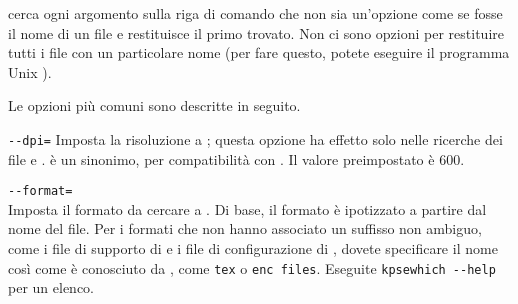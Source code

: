 \documentclass{article}
\begin{document}
\KPS{} cerca ogni argomento sulla riga di comando che non sia un'opzione
come se fosse il nome di un file e restituisce il primo trovato. Non ci
sono opzioni per restituire tutti i file con un particolare nome (per fare
questo, potete eseguire il programma Unix ).

Le opzioni più comuni sono descritte in seguito.

\begin{ttdescription}
\item[\texttt{-{}-dpi=\var{num}}]\mbox{}
  Imposta la risoluzione a ; questa opzione ha effetto solo
  nelle ricerche dei file  e .  è un sinonimo,
  per compatibilità con . Il valore preimpostato è 600.

\item[\texttt{-{}-format=\var{nome}}]\mbox{}\\
  Imposta il formato da cercare a . Di base, il formato è
  ipotizzato a partire dal nome del file. Per i formati che non hanno
  associato un suffisso non ambiguo, come i file di supporto di \MP{} e i
  file di configurazione di , dovete specificare il nome
  così come è conosciuto da \KPS{}, come \texttt{tex} o \texttt{enc
  files}. Eseguite \texttt{kpsewhich -{}-help} per un elenco.


\end{ttdescription}
\end{document}
